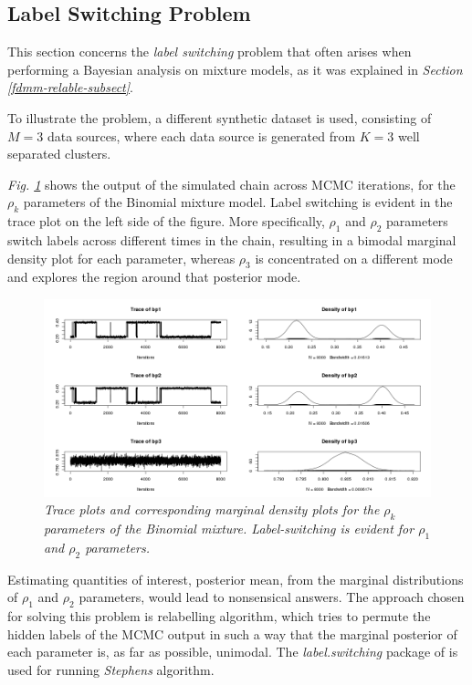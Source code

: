 \subsection{Label Switching Problem} \label{integr-synth-label-sect}
This section concerns the \emph{label switching} problem that often arises when performing a Bayesian analysis on mixture models, as it was explained in \emph{Section \ref{fdmm-relable-subsect}}.

To illustrate the problem, a different synthetic dataset is used, consisting of $M=3$ data sources, where each data source is generated from $K=3$ well separated clusters. 

\emph{Fig. \ref{labelBP-pic}} shows the output of the simulated chain across MCMC iterations, for the $\rho_{k}$ parameters of the Binomial mixture model. Label switching is evident in the trace plot on the left side of the figure. More specifically, $\rho_{1}$ and $\rho_{2}$ parameters switch labels across different times in the chain, resulting in a bimodal marginal density plot for each parameter, whereas $\rho_{3}$ is concentrated on a different mode and explores the region around that posterior mode. 
\begin{figure}[!ht]
\begin{center}
 \includegraphics[scale = 0.39]{images/labelBP.png}
\caption{\emph{Trace plots and corresponding marginal density plots for the $\rho_{k}$ parameters of the Binomial mixture. Label-switching is evident for $\rho_{1}$ and $\rho_{2}$ parameters.}}
\label{labelBP-pic}
\end{center}
\end{figure}

Estimating quantities of interest, \eg posterior mean, from the marginal distributions of $\rho_{1}$ and $\rho_{2}$ parameters, would lead to nonsensical answers. The approach chosen for solving this problem is \citet{Stephens2000} relabelling algorithm, which tries to permute the hidden labels of the MCMC output in such a way that the marginal posterior of each parameter is, as far as possible, unimodal. The \emph{label.switching} package of \citet{Papastamoulis2015} is used for running \emph{Stephens} algorithm. 

